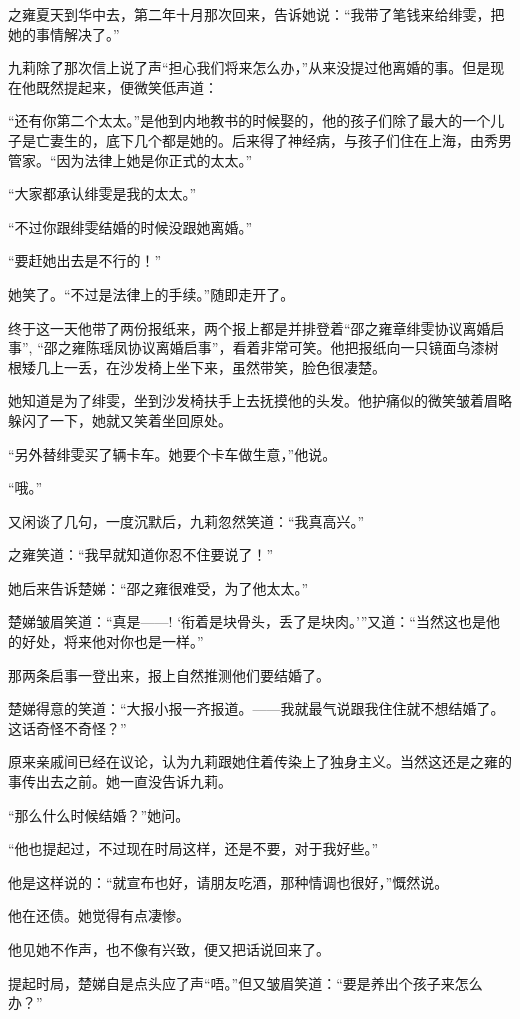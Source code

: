 \par 之雍夏天到华中去，第二年十月那次回来，告诉她说：“我带了笔钱来给绯雯，把她的事情解决了。”
\par 九莉除了那次信上说了声“担心我们将来怎么办，”从来没提过他离婚的事。但是现在他既然提起来，便微笑低声道：
\par “还有你第二个太太。”是他到内地教书的时候娶的，他的孩子们除了最大的一个儿子是亡妻生的，底下几个都是她的。后来得了神经病，与孩子们住在上海，由秀男管家。“因为法律上她是你正式的太太。”
\par “大家都承认绯雯是我的太太。”
\par “不过你跟绯雯结婚的时候没跟她离婚。”
\par “要赶她出去是不行的！”
\par 她笑了。“不过是法律上的手续。”随即走开了。
\par 终于这一天他带了两份报纸来，两个报上都是并排登着“邵之雍章绯雯协议离婚启事”, “邵之雍陈瑶凤协议离婚启事”，看着非常可笑。他把报纸向一只镜面乌漆树根矮几上一丢，在沙发椅上坐下来，虽然带笑，脸色很凄楚。
\par 她知道是为了绯雯，坐到沙发椅扶手上去抚摸他的头发。他护痛似的微笑皱着眉略躲闪了一下，她就又笑着坐回原处。
\par “另外替绯雯买了辆卡车。她要个卡车做生意，”他说。
\par “哦。”
\par 又闲谈了几句，一度沉默后，九莉忽然笑道：“我真高兴。”
\par 之雍笑道：“我早就知道你忍不住要说了！”
\par 她后来告诉楚娣：“邵之雍很难受，为了他太太。”
\par 楚娣皱眉笑道：“真是——! ‘衔着是块骨头，丢了是块肉。'”又道：“当然这也是他的好处，将来他对你也是一样。”
\par 那两条启事一登出来，报上自然推测他们要结婚了。
\par 楚娣得意的笑道：“大报小报一齐报道。——我就最气说跟我住住就不想结婚了。这话奇怪不奇怪？”
\par 原来亲戚间已经在议论，认为九莉跟她住着传染上了独身主义。当然这还是之雍的事传出去之前。她一直没告诉九莉。
\par “那么什么时候结婚？”她问。
\par “他也提起过，不过现在时局这样，还是不要，对于我好些。”
\par 他是这样说的：“就宣布也好，请朋友吃酒，那种情调也很好，”慨然说。
\par 他在还债。她觉得有点凄惨。
\par 他见她不作声，也不像有兴致，便又把话说回来了。
\par 提起时局，楚娣自是点头应了声“唔。”但又皱眉笑道：“要是养出个孩子来怎么办？”

